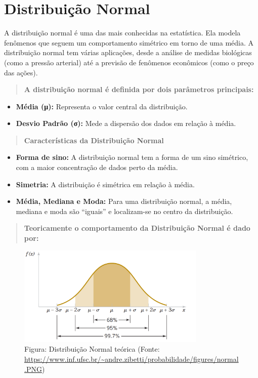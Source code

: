 \documentclass[
]{book}
\providecommand{\tightlist}{%
  \setlength{\itemsep}{0pt}\setlength{\parskip}{0pt}}
\begin{document}
\section{Distribuição Normal}\label{distribuiuxe7uxe3o-normal}

A distribuição normal é uma das mais conhecidas na estatística. Ela modela fenômenos que seguem um comportamento simétrico em torno de uma média. A distribuição normal tem várias aplicações, desde a análise de medidas biológicas (como a pressão arterial) até a previsão de fenômenos econômicos (como o preço das ações).

\begin{quote}
\textbf{A distribuição normal é definida por dois parâmetros principais:}
\end{quote}

\begin{itemize}
\tightlist
\item
  \textbf{Média (μ):} Representa o valor central da distribuição.
\item
  \textbf{Desvio Padrão (σ):} Mede a dispersão dos dados em relação à média.
\end{itemize}

\begin{quote}
\textbf{Características da Distribuição Normal}
\end{quote}

\begin{itemize}
\tightlist
\item
  \textbf{Forma de sino:} A distribuição normal tem a forma de um sino simétrico, com a maior concentração de dados perto da média.
\item
  \textbf{Simetria:} A distribuição é simétrica em relação à média.
\item
  \textbf{Média, Mediana e Moda:} Para uma distribuição normal, a média, mediana e moda são ``iguais'' e localizam-se no centro da distribuição.
\end{itemize}

\begin{quote}
\textbf{Teoricamente o comportamento da Distribuição Normal é dado por:}
\end{quote}

\begin{figure}
\centering
\includegraphics[width=0.8\textwidth,height=\textheight]{normalTeorica.png}
\caption{Figura: Distribuição Normal teórica (Fonte: \url{https://www.inf.ufsc.br/~andre.zibetti/probabilidade/figures/normal.PNG})}
\end{figure}
\end{document}

